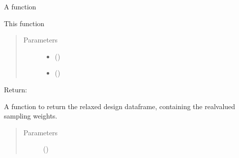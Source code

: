 \documentclass[letterpaper,10pt,english,openany,oneside]{sphinxmanual}
\begin{document}
\begin{fulllineitems}
\begin{fulllineitems}
\begin{quote}
\begin{description}
\end{description}\end{quote}

\end{fulllineitems}


\begin{fulllineitems}
\label{\detokenize{nloed:nloed.design.Design.round}}
A function

This function
\begin{quote}\begin{description}
\item[{Parameters}] \leavevmode\begin{itemize}
\item {} 
 () \textendash{} 

\item {} 
 () \textendash{} 

\end{itemize}

\end{description}\end{quote}

Return:

\end{fulllineitems}


\begin{fulllineitems}
\label{\detokenize{nloed:nloed.design.Design.relaxed}}
A function to return the relaxed design dataframe, containing the real\sphinxhyphen{}valued sampling
weights.
\begin{quote}\begin{description}
\item[{Parameters}] \leavevmode
\sphinxstyleliteralstrong{\sphinxupquote{(}}\sphinxstyleliteralstrong{\sphinxupquote{)}} () \textendash{} 


\end{description}
\end{quote}
\end{fulllineitems}
\end{fulllineitems}
\end{document}
